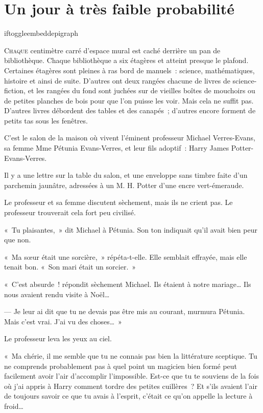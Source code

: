 \chapter{Un jour à très faible probabilité}

iftoggle{embeddepigraph}{}{}

\lettrine{C}{haque} centimètre carré d'espace mural est caché derrière un pan de bibliothèque. Chaque bibliothèque a six étagères et atteint presque le
plafond. Certaines étagères sont pleines à ras bord de manuels~: science, mathématiques, histoire et ainsi de suite. D'autres ont deux rangées chacune de livres de science-fiction, et les rangées du fond sont juchées sur de vieilles boîtes de mouchoirs\footnotemark{} ou de petites planches de bois pour que l'on puisse les voir. Mais cela ne suffit pas. D'autres livres débordent des tables et des canapés~; d'autres encore forment de petits tas sous les fenêtres.

C'est le salon de la maison où vivent l'éminent professeur Michael Verres-Evans, sa femme Mme Pétunia Evans-Verres, et leur fils adoptif~: Harry James Potter-Evans-Verres.

Il y a une lettre sur la table du salon, et une enveloppe sans timbre faite d'un parchemin jaunâtre, adressées à un M. H. Potter d'une encre vert-émeraude.

Le professeur et sa femme discutent sèchement, mais ils ne crient pas. Le professeur trouverait cela fort peu civilisé.

«~Tu plaisantes,~» dit Michael à Pétunia. Son ton indiquait qu'il avait bien peur que non.

«~Ma sœur était une sorcière,~» répéta-t-elle. Elle semblait effrayée, mais elle tenait bon. «~Son mari était un sorcier.~»

«~C'est absurde~! répondit sèchement Michael. Ils étaient à notre mariage… Ils nous avaient rendu visite à Noël…

--- Je leur ai dit que tu ne devais pas être mis au courant, murmura Pétunia. Mais c'est vrai. J'ai vu des choses…~»

Le professeur leva les yeux au ciel.

«~Ma chérie, il me semble que tu ne connais pas bien la littérature sceptique. Tu ne comprends probablement pas à quel point un magicien bien formé peut facilement avoir l'air d'accomplir l'impossible. Est-ce que tu te souviens de la fois où j'ai appris à Harry comment tordre des petites cuillères~? Et s'ils avaient l'air de toujours savoir ce que tu avais à l'esprit, c'était ce qu'on appelle la lecture à froid…

